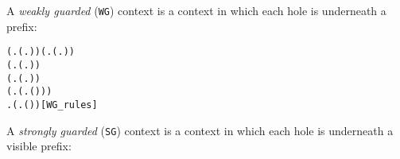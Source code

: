 A \emph{weakly guarded} (\texttt{WG}) context is a context in which each hole is
underneath a prefix:
\begin{alltt}
\HOLTokenTurnstile{} (\HOLSymConst{\HOLTokenForall{}}.  (\HOLTokenLambda{}. )) \HOLSymConst{\HOLTokenConj{}} (\HOLSymConst{\HOLTokenForall{}} .   \HOLSymConst{\HOLTokenImp{}}  (\HOLTokenLambda{}.  )) \HOLSymConst{\HOLTokenConj{}}
   (\HOLSymConst{\HOLTokenForall{}} .   \HOLSymConst{\HOLTokenConj{}}   \HOLSymConst{\HOLTokenImp{}}  (\HOLTokenLambda{}.   \HOLSymConst{+}  )) \HOLSymConst{\HOLTokenConj{}}
   (\HOLSymConst{\HOLTokenForall{}} .   \HOLSymConst{\HOLTokenConj{}}   \HOLSymConst{\HOLTokenImp{}}  (\HOLTokenLambda{}.   \HOLSymConst{\ensuremath{\parallel}}  )) \HOLSymConst{\HOLTokenConj{}}
   (\HOLSymConst{\HOLTokenForall{}} .   \HOLSymConst{\HOLTokenImp{}}  (\HOLTokenLambda{}. \HOLSymConst{\ensuremath{\nu}}  ( ))) \HOLSymConst{\HOLTokenConj{}}
   \HOLSymConst{\HOLTokenForall{}} .   \HOLSymConst{\HOLTokenImp{}}  (\HOLTokenLambda{}.  ( ) )\hfill{[WG_rules]}
\end{alltt}
A \emph{strongly guarded} (\texttt{SG}) context is a context in which
 each hole is underneath a visible prefix:
